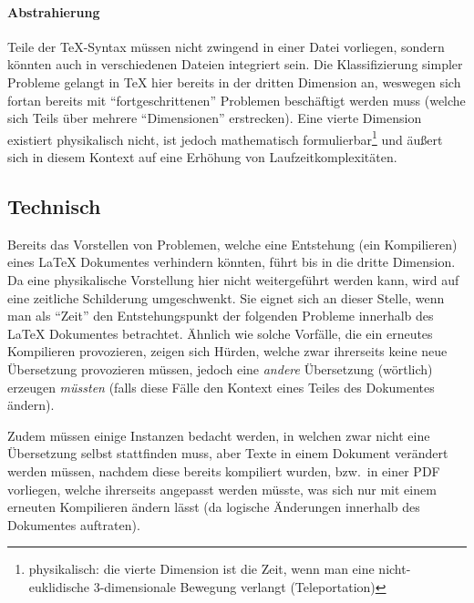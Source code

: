 \paragraph*{Abstrahierung}%
Teile der \TeX-Syntax müssen nicht zwingend in einer Datei vorliegen, sondern könnten auch in verschiedenen Dateien integriert sein. Die Klassifizierung simpler Probleme gelangt in \TeX{} hier bereits in der dritten Dimension an, weswegen sich fortan bereits mit \enquote{fortgeschrittenen} Problemen beschäftigt werden muss (welche sich Teils über mehrere \enquote{Dimensionen} erstrecken). Eine vierte Dimension existiert physikalisch nicht, ist jedoch mathematisch formulierbar\footnote{physikalisch: die vierte Dimension ist die Zeit, wenn man eine nicht-euklidische 3-dimensionale Bewegung verlangt (Teleportation)} und äußert sich in diesem Kontext auf eine Erhöhung von Laufzeitkomplexitäten.





\subsection{Technisch}\label{problems:advanced}
Bereits das Vorstellen von Problemen, welche eine Entstehung (ein Kompilieren) eines \LaTeX{} Dokumentes verhindern könnten, führt bis in die dritte Dimension. Da eine physikalische Vorstellung hier nicht weitergeführt werden kann, wird auf eine zeitliche Schilderung umgeschwenkt. Sie eignet sich an dieser Stelle, wenn man als \enquote{Zeit} den Entstehungspunkt der folgenden Probleme innerhalb des \LaTeX{} Dokumentes betrachtet. Ähnlich wie solche Vorfälle, die ein erneutes Kompilieren provozieren, zeigen sich Hürden, welche zwar ihrerseits keine neue Übersetzung provozieren müssen, jedoch eine \textit{andere} Übersetzung (wörtlich) erzeugen \textit{müssten} (falls diese Fälle den Kontext eines Teiles des Dokumentes ändern).%

Zudem müssen einige Instanzen bedacht werden, in welchen zwar nicht eine Übersetzung selbst stattfinden muss, aber Texte in einem Dokument verändert werden müssen, nachdem diese bereits kompiliert wurden, bzw.\ in einer PDF vorliegen, welche ihrerseits angepasst werden müsste, was sich nur mit einem erneuten Kompilieren ändern lässt (da logische Änderungen innerhalb des Dokumentes auftraten).%

